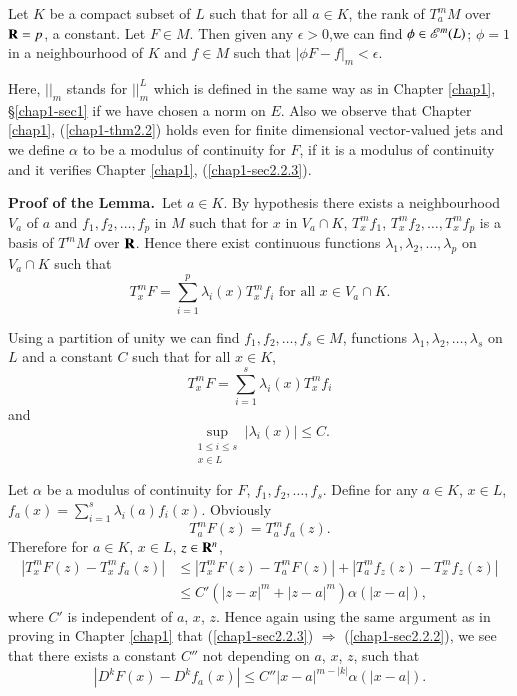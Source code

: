 \begin{lemma}\label{chap2-lem1.4}
Let $K$ be a compact subset of $L$ such that for all $a\in K$, the rank of $T^{m}_{a}M$ over $\mathbf{R}=p$, a constant. Let $F\in M$. Then given any $\epsilon > 0$,\pageoriginale we can find $\phi\in \mathscr{E}^{m}(L)$; $\phi=1$ in a neighbourhood of $K$ and $f\in M$ such that $|\phi F-f|_{m}<\epsilon$.
\end{lemma}

Here, $||_{m}$ stands for $||^{L}_{m}$ which is defined in the same way as in Chapter \ref{chap1}, \S\ref{chap1-sec1} if we have chosen a norm on $E$. Also we observe that Chapter \ref{chap1}, (\ref{chap1-thm2.2}) holds even for finite dimensional vector-valued jets and we define $\alpha$ to be a modulus of continuity for $F$, if it is a modulus of continuity and it verifies Chapter \ref{chap1}, (\ref{chap1-sec2.2.3}).

\medskip
\noindent
{\bf Proof of the Lemma.}~Let $a\in K$. By hypothesis there exists a neighbourhood $V_{a}$ of $a$ and $f_{1},f_{2},\ldots,f_{p}$ in $M$ such that for $x$ in $V_{a}\cap K$, $T^{m}_{x}f_{1}$, $T^{m}_{x}f_{2},\ldots,T^{m}_{x}f_{p}$ is a basis of $T^{m}M$ over $\mathbf{R}$. Hence there exist continuous functions $\lambda_{1},\lambda_{2},\ldots,\lambda_{p}$ on $V_{a}\cap K$ such that
$$
T^{m}_{x}F=\sum\limits^{p}_{i=1}\lambda_{i}(x)T^{m}_{x}f_{i}\text{ for all } x\in V_{a}\cap K.
$$

Using a partition of unity we can find $f_{1}, f_{2},\ldots,f_{s}\in M$, functions $\lambda_{1},\lambda_{2},\ldots,\lambda_{s}$ on $L$ and a constant $C$ such that for all $x\in K$,
$$
T^{m}_{x}F=\sum\limits^{s}_{i=1}\lambda_{i}(x)T^{m}_{x}f_{i}
$$
and
$$
\sup\limits_{\substack{1\leq i\leq s\\ x\in L}}|\lambda_{i}(x)|\leq C.
$$

Let $\alpha$ be a modulus of continuity for $F$, $f_{1},f_{2},\ldots,f_{s}$. Define for any $a\in K$, $x\in L$, $f_{a}(x)=\sum\limits^{s}_{i=1}\lambda_{i}(a)f_{i}(x)$. Obviously
$$
T^{m}_{a}F(z)=T^{m}_{a}f_{a}(z).
$$
Therefore for $a\in K$, $x\in L$, $z\in \mathbf{R}^{n}$,
\begin{align*}
|T^{m}_{x}F(z)-T^{m}_{x}f_{a}(z)| &\leq |T^{m}_{x}F(z)-T^{m}_{a}F(z)|+|T^{m}_{a}f_{z}(z)-T^{m}_{x}f_{z}(z)|\\
& \leq C'(|z-x|^{m}+|z-a|^{m})\alpha (|x-a|),\tag{1.4.2}\label{chap2-eq1.4.2}
\end{align*}
where $C'$ is independent of $a$, $x$, $z$. Hence again using the same argument as in proving in Chapter \ref{chap1} that (\ref{chap1-sec2.2.3}) $\Rightarrow$ (\ref{chap1-sec2.2.2}), we see that there exists a constant $C''$ not depending on $a$, $x$, $z$, such that
\begin{equation*}
|D^{k}F(x)-D^{k}f_{a}(x)|\leq C''|x-a|^{m-|k|}\alpha(|x-a|).\tag{1.4.2}\label{chap2-add-eq1.4.2}
\end{equation*}

